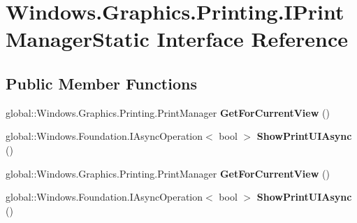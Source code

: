 \hypertarget{interface_windows_1_1_graphics_1_1_printing_1_1_i_print_manager_static}{}\section{Windows.\+Graphics.\+Printing.\+I\+Print\+Manager\+Static Interface Reference}
\label{interface_windows_1_1_graphics_1_1_printing_1_1_i_print_manager_static}
\subsection*{Public Member Functions}
\begin{DoxyCompactItemize}
\item 
\mbox{\label{interface_windows_1_1_graphics_1_1_printing_1_1_i_print_manager_static_a49be49c2a159d64c554f46a2999627b0}} 
global\+::\+Windows.\+Graphics.\+Printing.\+Print\+Manager {\bfseries Get\+For\+Current\+View} ()
\item 
\mbox{\label{interface_windows_1_1_graphics_1_1_printing_1_1_i_print_manager_static_ac19fbbfc587c81192c5d214e451f07be}} 
global\+::\+Windows.\+Foundation.\+I\+Async\+Operation$<$ bool $>$ {\bfseries Show\+Print\+U\+I\+Async} ()
\item 
\mbox{\label{interface_windows_1_1_graphics_1_1_printing_1_1_i_print_manager_static_a49be49c2a159d64c554f46a2999627b0}} 
global\+::\+Windows.\+Graphics.\+Printing.\+Print\+Manager {\bfseries Get\+For\+Current\+View} ()
\item 
\mbox{\label{interface_windows_1_1_graphics_1_1_printing_1_1_i_print_manager_static_ac19fbbfc587c81192c5d214e451f07be}} 
global\+::\+Windows.\+Foundation.\+I\+Async\+Operation$<$ bool $>$ {\bfseries Show\+Print\+U\+I\+Async} ()
\item 
\mbox{\label{interface_windows_1_1_graphics_1_1_printing_1_1_i_print_manager_static_a49be49c2a159d64c554f46a2999627b0}} 

\end{DoxyCompactItemize}
